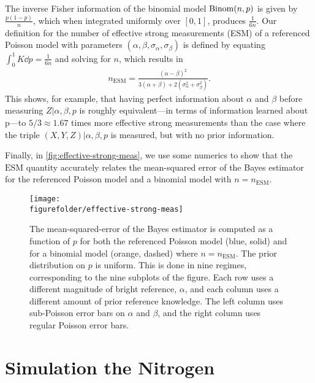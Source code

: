 \documentclass[aps,nofootinbib,twocolumn,superscriptaddress]{revtex4}
\newcommand{\figurefolder}{../fig}
\newcommand{\ESM}{\text{ESM}}
\begin{document}
The inverse Fisher information of the binomial model $\operatorname{Binom}(n,p)$
is given by $\frac{p(1-p)}{n}$, which when integrated uniformly over 
$[0,1]$, produces $\frac{1}{6n}$.
Our definition for the number of effective strong measurements (ESM)
of a referenced Poisson model with parameters 
$(\alpha,\beta,\sigma_\alpha,\sigma_\beta)$ is defined by 
equating $\int_0^1 K\dd p=\frac{1}{6n}$ and solving for $n$,
which results in
\begin{align}
    n_\ESM = \frac{
            (\alpha-\beta)^2
        }{
            3(\alpha+\beta)+2\left(\sigma_\alpha^2+\sigma_\beta^2\right)
        }.
\end{align}
This shows, for example, 
that having perfect information about $\alpha$ and $\beta$
before measuring $Z|\alpha,\beta,p$ is roughly equivalent---in terms
of information learned about p---to 
$5/3\approx 1.67$ times more effective strong measurements 
than the case where the triple $(X,Y,Z)|\alpha,\beta,p$ is
measured, but with no prior information.

Finally, in \autoref{fig:effective-strong-meas}, we use some numerics
to show that the $\ESM$
quantity accurately relates the mean-squared error of the Bayes estimator
for the referenced Poisson model and a binomial model with $n=n_\ESM$.

\begin{figure}
    \texttt{[image: \\figurefolder/effective-strong-meas]}
    \caption{The mean-squared-error of the Bayes estimator is computed
    as a function of $p$
    for both the referenced Poisson model (blue, solid) and for a binomial model
    (orange, dashed) where $n=n_\ESM$.
    The prior distribution on $p$ is uniform.
    This is done in nine regimes, corresponding to the nine subplots of the figure.
    Each row uses a different magnitude of bright reference, $\alpha$,
    and each column uses a different amount of prior reference knowledge.
    The left column uses sub-Poisson error bars on $\alpha$ and $\beta$,
    and the right column uses regular Poisson error bars.}
    \label{fig:effective-strong-meas}
\end{figure}

\section{Simulation the Nitrogen}
\label{apx:nitrogen-sim}
\end{document}
